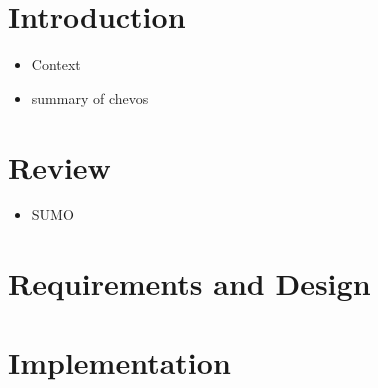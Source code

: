 

\section{Introduction}

\begin{itemize}
	\item Context
	\item summary of chevos
\end{itemize}

\section{Review}

\begin{itemize}
    \item SUMO
\end{itemize}

\section{Requirements and Design}




\section{Implementation}

